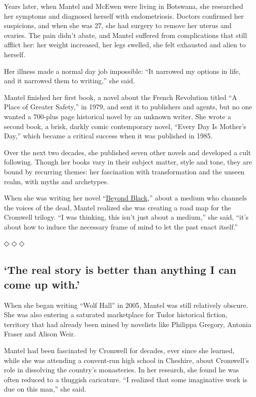 Years later, when Mantel and McEwen were living in Botswana, she
researched her symptoms and diagnosed herself with endometriosis.
Doctors confirmed her suspicions, and when she was 27, she had surgery
to remove her uterus and ovaries. The pain didn't abate, and Mantel
suffered from complications that still afflict her: her weight
increased, her legs swelled, she felt exhausted and alien to herself.

Her illness made a normal day job impossible: ``It narrowed my options
in life, and it narrowed them to writing,'' she said.

Mantel finished her first book, a novel about the French Revolution
titled ``A Place of Greater Safety,'' in 1979, and sent it to publishers
and agents, but no one wanted a 700-plus page historical novel by an
unknown writer. She wrote a second book, a brisk, darkly comic
contemporary novel, ``Every Day Is Mother's Day,'' which became a
critical success when it was published in 1985.

Over the next two decades, she published seven other novels and
developed a cult following. Though her books vary in their subject
matter, style and tone, they are bound by recurring themes: her
fascination with transformation and the unseen realm, with myths and
archetypes.

When she was writing her novel
``\href{https://www.nytimes.com/2005/05/15/books/review/beyond-black-demons-revealed.html}{Beyond
Black},'' about a medium who channels the voices of the dead, Mantel
realized she was creating a road map for the Cromwell trilogy. ``I was
thinking, this isn't just about a medium,'' she said, ``it's about how
to induce the necessary frame of mind to let the past enact itself.''

◇ ◇ ◇

\hypertarget{the-real-story-is-better-than-anything-i-can-come-up-with}{%
\subsection{`The real story is better than anything I can come up
with.'}\label{the-real-story-is-better-than-anything-i-can-come-up-with}}

When she began writing ``Wolf Hall'' in 2005, Mantel was still
relatively obscure. She was also entering a saturated marketplace for
Tudor historical fiction, territory that had already been mined by
novelists like Philippa Gregory, Antonia Fraser and Alison Weir.

Mantel had been fascinated by Cromwell for decades, ever since she
learned, while she was attending a convent-run high school in Cheshire,
about Cromwell's role in dissolving the country's monasteries. In her
research, she found he was often reduced to a thuggish caricature. ``I
realized that some imaginative work is due on this man,'' she said.


